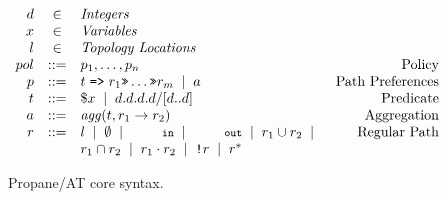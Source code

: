\documentclass[numbers, 10pt]{sigplanconf}
\newcommand{\sysname}{{\text{}\small \sf Propane/AT}\xspace}
\newcommand{\CD}[1]{\texttt{\small #1}}
\newcommand{\Prefer}{\texttt{>>}}
\newcommand{\Path}{\texttt{=>}}
\newcommand{\NOT}{\texttt{!}}
\renewcommand{\path}[2]{ #1 \mapsto \ensuremath{#2} }
\newcommand{\BNFALT}{\;\;|\;\;}
\begin{document}
\begin{figure}[t]\small
  \begin{minipage}[t]{\linewidth}
  \vspace*{-1\baselineskip}
  \[ \begin{array}{rclr}
     d       &\in& \textit{Integers} \\
     x       &\in& \textit{Variables} \\
     l       &\in& \textit{Topology Locations} \\
     pol     &::=& p_1, \dots, p_n & \text{Policy} \\
     p       &::=& t \hspace{.3em} \Path \hspace{.3em} r_1 \Prefer \dots \Prefer r_m \BNFALT a & \text{Path Preferences}  \\
     t       &::=& \$x \BNFALT d.d.d.d/[d..d] \hspace{1.5em} & \text{Predicate} \\
     a      &::=& \mathit{agg}(t, r_1 \rightarrow r_2) & \text{Aggregation} \\
     r       &::=& l \BNFALT \emptyset \BNFALT \CD{in} \BNFALT \CD{out} \BNFALT r_1 \cup r_2 \BNFALT & \text{Regular Path} \\
             &   & r_1 \cap r_2 \BNFALT r_1 \cdot r_2 \BNFALT \NOT r \BNFALT r^* \\
  \end{array} \]%

  \end{minipage}
  \vspace{-.4em}
  \caption{\sysname core syntax.}
  \label{fig:syntax}
  \vspace{-0.8em}
\end{figure}%




\newcommand{\state}[4]{\node[state,#3](#1)[#4]{#2};}
\newcommand{\transition}[4]{\path[->] (#1) edge [#4] node {#3} (#2);}
\end{document}
